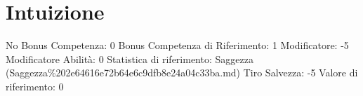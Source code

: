 \section{Intuizione}\label{intuizione}

\begin{description}
\tightlist
\item[Tags: ABI]
No Bonus Competenza: 0 Bonus Competenza di Riferimento: 1 Modificatore:
-5 Modificatore Abilità: 0 Statistica di riferimento: Saggezza
(Saggezza\%202e64616e72b64e6c9dfb8e24a04c33ba.md) Tiro Salvezza: -5
Valore di riferimento: 0
\end{description}
